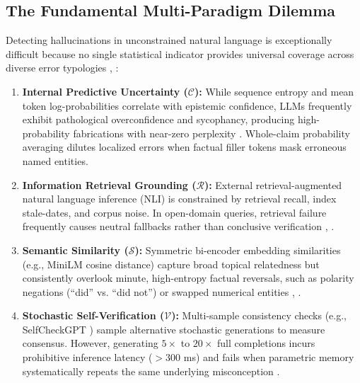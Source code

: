 \documentclass[conference]{IEEEtran}
\begin{document}
\subsection{The Fundamental Multi-Paradigm Dilemma}
Detecting hallucinations in unconstrained natural language is exceptionally difficult because no single statistical indicator provides universal coverage across diverse error typologies \cite{b6}, \cite{b7}:
\begin{enumerate}
    \item \textbf{Internal Predictive Uncertainty ($\mathcal{C}$):} While sequence entropy and mean token log-probabilities correlate with epistemic confidence, LLMs frequently exhibit pathological overconfidence and sycophancy, producing high-probability fabrications with near-zero perplexity \cite{b9}. Whole-claim probability averaging dilutes localized errors when factual filler tokens mask erroneous named entities.
    \item \textbf{Information Retrieval Grounding ($\mathcal{R}$):} External retrieval-augmented natural language inference (NLI) is constrained by retrieval recall, index stale-dates, and corpus noise. In open-domain queries, retrieval failure frequently causes neutral fallbacks rather than conclusive verification \cite{b7}, \cite{b8}.
    \item \textbf{Semantic Similarity ($\mathcal{S}$):} Symmetric bi-encoder embedding similarities (e.g., MiniLM cosine distance) capture broad topical relatedness but consistently overlook minute, high-entropy factual reversals, such as polarity negations (``did'' vs. ``did not'') or swapped numerical entities \cite{b1}, \cite{b4}.
    \item \textbf{Stochastic Self-Verification ($\mathcal{V}$):} Multi-sample consistency checks (e.g., SelfCheckGPT \cite{b12}) sample alternative stochastic generations to measure consensus. However, generating $5\times$ to $20\times$ full completions incurs prohibitive inference latency ($>300$ ms) and fails when parametric memory systematically repeats the same underlying misconception \cite{b4}.
\end{enumerate}
\end{document}
